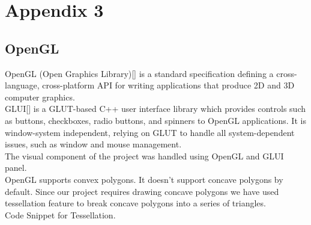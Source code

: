 

\chapter{Appendix 3}

\section{OpenGL}

OpenGL (Open Graphics Library)[\cite{OpenGL}] is a standard specification defining a cross-language, cross-platform API for writing applications that produce 2D and 3D computer graphics.\\

\noindent GLUI[\cite{GLUI}] is a GLUT-based C++ user interface library which provides controls such as buttons, checkboxes, radio buttons, and spinners to OpenGL applications. It is window-system independent, relying on GLUT to handle all system-dependent issues, such as window and mouse management.\\
The visual component of the project was handled using OpenGL and GLUI panel.\\

\noindent OpenGL supports convex polygons. It doesn’t support concave polygons by default. Since our project requires drawing concave polygons we have used tessellation feature to break concave polygons into a series of triangles.\\
Code Snippet for Tessellation.\\

